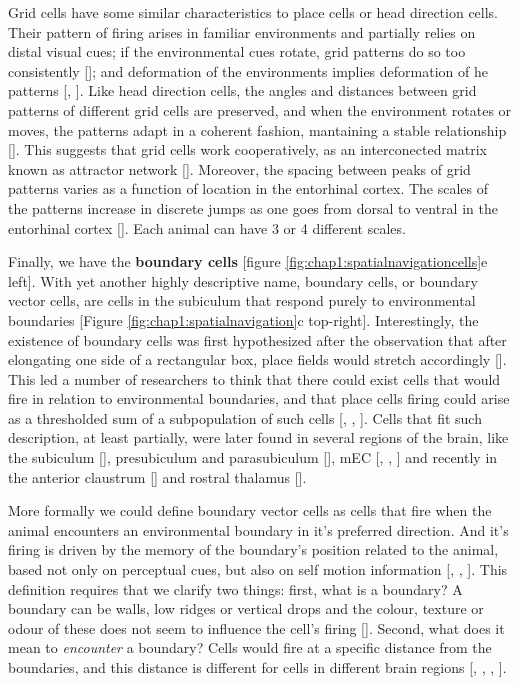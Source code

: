 Grid cells have some similar characteristics to place cells or head direction cells.
Their pattern of firing arises in familiar environments and partially relies on distal visual cues; if the environmental cues rotate, grid patterns do so too consistently [\cite{hafting2005}]; and deformation of the environments implies deformation of he patterns [\cite{barry2007}, \cite{stensola2012}].
Like head direction cells, the angles and distances between grid patterns of different grid cells are preserved, and when the environment rotates or moves, the patterns adapt in a coherent fashion, mantaining a stable relationship [\cite{fyhn2007}].
This suggests that grid cells work cooperatively, as an interconected matrix known as attractor network [\cite{mcNaughton2006}].
Moreover, the spacing between peaks of grid patterns varies as a function of location in the entorhinal cortex. 
The scales of the patterns increase in discrete jumps as one goes from dorsal to ventral in the entorhinal cortex [\cite{brun2008}].
Each animal can have 3 or 4 different scales. 

Finally, we have the \textbf{boundary cells} [figure \ref{fig:chap1:spatialnavigationcells}e left].
With yet another highly descriptive name, boundary cells, or boundary vector cells, are cells in the subiculum that respond purely to environmental boundaries [Figure \ref{fig:chap1:spatialnavigation}c top-right].
Interestingly, the existence of boundary cells was first hypothesized after the observation that after elongating one side of a rectangular box, place fields would stretch accordingly [\cite{oKeefe1996}].
This led a number of researchers to think that there could exist cells that would fire in relation to environmental boundaries, and that place cells firing could arise as a thresholded sum of a subpopulation of such cells [\cite{barry2006}, \cite{burgess1997}, \cite{hartley2000}]. 
Cells that fit such description, at least partially, were later found in several regions of the brain, like the subiculum [\cite{barry2006}], presubiculum and parasubiculum [\cite{boccara2010}], mEC [\cite{bjerknes2014}, \cite{savelli2008}, \cite{solstad2008}] and recently in the anterior claustrum [\cite{jankowskiomara2015}] and rostral thalamus [\cite{jankowski2015}].

More formally we could define boundary vector cells as cells that fire when the animal encounters an environmental boundary in it's preferred direction.
And it's firing is driven by the memory of the boundary's position related to the animal, based not only on perceptual cues, but also on self motion information [\cite{lever2009}, \cite{raudies2012}, \cite{raudieshasselmo2012}]. 
This definition requires that we clarify two things: first, what is a boundary? A boundary can be walls, low ridges or vertical drops and the colour, texture or odour of these does not seem to influence the cell’s firing [\cite{lever2009}].
Second, what does it mean to \textit{encounter} a boundary? Cells would fire at a specific distance from the boundaries, and this distance is different for cells in different brain regions [\cite{bjerknes2014}, \cite{solstad2008}, \cite{jankowski2015}, \cite{lever2009}].

